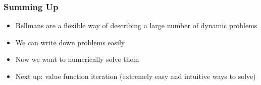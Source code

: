 \documentclass{beamer}
\begin{document}
\begin{frame}
\frametitle[alignment=center]{Summing Up}
\begin{itemize}
\item Bellmans are a flexible way of describing a large number of dynamic problems
\bigskip
\item We can write down problems easily
\bigskip
\item Now we want to numerically solve them
\bigskip
\item Next up:  value function iteration (extremely easy and intuitive ways to solve)
\end{itemize}
\end{frame}
\end{document}
